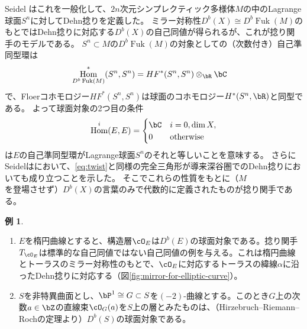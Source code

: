 \documentclass[a4j,uplatex,dvipdfmx]{jsarticle}
\numberwithin{equation}{section}
\numberwithin{figure}{section}
\theoremstyle{definition}
\newtheorem{example}[theorem]{例}
\DeclareMathOperator{\Hom}{\mathrm{Hom}}
\DeclareMathOperator{\Fuk}{Fuk}
\begin{document}
Seidel \cite{MR1743463}はこれを一般化して、$2n$次元シンプレクティック多様体$M$の中のLagrange球面$S^n$に対してDehn捻りを定義した。
ミラー対称性$D^b(X) \cong D^b \Fuk(M)$のもとではDehn捻りに対応する$D^b(X)$の自己同値が得られるが、これが捻り関手のモデルである。
$S^n \subset M$の$D^b\Fuk(M)$の対象としての（次数付き）自己準同型環は
\begin{align}
    \Hom_{D^b\Fuk(M)}^*(S^n, S^n) & = HF^*(S^n, S^n)\otimes_\bR \bC
\end{align}
で、Floerコホモロジー$HF^*(S^n, S^n)$は球面のコホモロジー$H^*(S^n, \bR)$と同型である。
よって球面対象の2つ目の条件
\begin{equation}
    \Hom^i(E, E) = \begin{cases}
        \bC & i = 0, \dim X,   \\
        0   & \text{otherwise}
    \end{cases}
\end{equation}
は$E$の自己準同型環がLagrange球面$S^n$のそれと等しいことを意味する。
さらにSeidelは\cite{MR1978046}において、\eqref{eq:twist}と同様の完全三角形が導来深谷圏でのDehn捻りにおいても成り立つことを示した。
そこでこれらの性質をもとに（$M$を登場させず）$D^b(X)$の言葉のみで代数的に定義されたものが捻り関手である。
\begin{example}
    \begin{enumerate}
        \item $E$を楕円曲線とすると、構造層$\cO_E$は$D^b(E)$の球面対象である。捻り関手$T_{\cO_E}$は標準的な自己同値ではない自己同値の例を与える。これは楕円曲線とトーラスのミラー対称性のもとで、$\cO_E$に対応するトーラスの緯線$\alpha$に沿ったDehn捻りに対応する（図\ref{fig:mirror-for-elliptic-curve}）。
        \item $S$を非特異曲面とし、$\bP^1 \cong G \subset S$を$(-2)$-曲線とする。このとき$G$上の次数$a \in \bZ$の直線束$\cO_G(a)$を$S$上の層とみたものは、（Hirzebruch--Riemann--Rochの定理より）$D^b(S)$の球面対象である。
    \end{enumerate}
\end{example}
\end{document}
